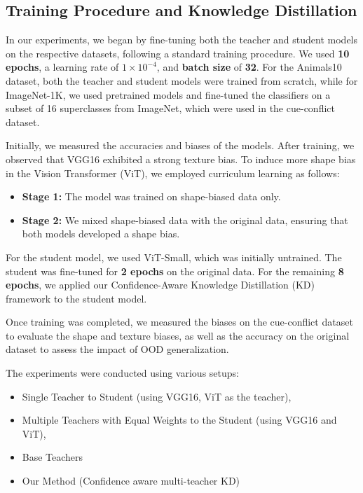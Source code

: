 \documentclass{article}
\begin{document}
\subsection{Training Procedure and Knowledge Distillation}

In our experiments, we began by fine-tuning both the teacher and student models on the respective datasets, following a standard training procedure. We used \textbf{10 epochs}, a learning rate of \boldmath\( 1 \times 10^{-4} \), and \textbf{batch size} of \textbf{32}. For the Animals10 dataset, both the teacher and student models were trained from scratch, while for ImageNet-1K, we used pretrained models and fine-tuned the classifiers on a subset of 16 superclasses from ImageNet, which were used in the cue-conflict dataset.

Initially, we measured the accuracies and biases of the models. After training, we observed that VGG16 exhibited a strong texture bias. To induce more shape bias in the Vision Transformer (ViT), we employed curriculum learning as follows:

\begin{itemize} [noitemsep, topsep=0pt]
    \item \textbf{Stage 1:} The model was trained on shape-biased data only.
    \item \textbf{Stage 2:} We mixed shape-biased data with the original data, ensuring that both models developed a shape bias.
\end{itemize}

For the student model, we used ViT-Small, which was initially untrained. The student was fine-tuned for \textbf{2 epochs} on the original data. For the remaining \textbf{8 epochs}, we applied our Confidence-Aware Knowledge Distillation (KD) framework to the student model.

Once training was completed, we measured the biases on the cue-conflict dataset to evaluate the shape and texture biases, as well as the accuracy on the original dataset to assess the impact of OOD generalization.

The experiments were conducted using various setups:
\begin{itemize}[noitemsep, topsep=0pt]
    \item Single Teacher to Student (using VGG16, ViT as the teacher),
    \item Multiple Teachers with Equal Weights to the Student (using VGG16 and ViT),
    \item Base Teachers
    \item Our Method (Confidence aware multi-teacher KD)
\end{itemize}
\end{document}
